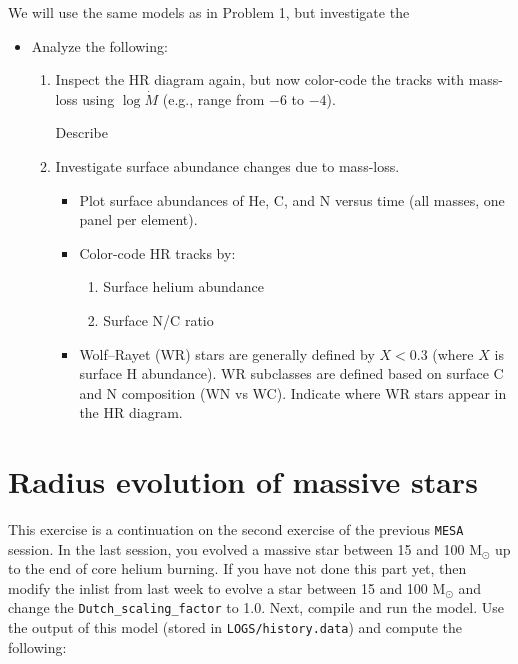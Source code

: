 \documentclass[11pt,a4paper]{article}
\begin{document}
We will use the same models as in Problem 1, but investigate the 

\begin{itemize}[leftmargin=1.5em]

    \item Analyze the following:
    \begin{enumerate}[label=(\alph*)]
        \item %
        Inspect the HR diagram again, but now color-code the tracks with mass-loss using $\log \dot{M}$ (e.g., range from $-6$ to $-4$).
        
        Describe %

        \item Investigate surface abundance changes due to mass-loss. 
        \begin{itemize}
            \item Plot surface abundances of He, C, and N versus time (all masses, one panel per element).
            \item Color-code HR tracks by:
            \begin{enumerate}
                \item Surface helium abundance
                \item Surface N/C ratio
            \end{enumerate}
            \item Wolf–Rayet (WR) stars are generally defined by $X < 0.3$ (where $X$ is surface H abundance). WR subclasses are defined based on surface C and N composition (WN vs WC). Indicate where WR stars appear in the HR diagram.
        \end{itemize}
    \end{enumerate}
\end{itemize}



\section{Radius evolution of massive stars}

This exercise is a continuation on the second exercise of the previous \texttt{MESA} session. In the last session, you evolved a massive star between 15 and 100 M$_\odot$ up to the end of core helium burning. If you have not done this part yet, then modify the inlist from last week to evolve a star between 15 and 100 M$_\odot$ and change the \verb|Dutch_scaling_factor| to 1.0. Next, compile and run the model. Use the output of this model (stored in \verb|LOGS/history.data|) and compute the following:
\end{document}
